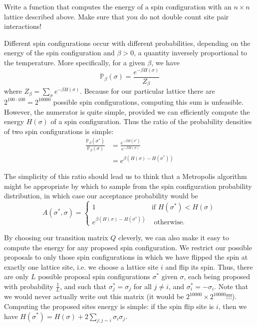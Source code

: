 \begin{problem}
Write a function that computes the energy of a spin configuration with an $n \times n$ lattice described above. Make sure that you do not double count site pair interactions!
\end{problem}

Different spin configurations occur with different probabilities, depending on the energy of the spin configuration and $\beta > 0$, a quantity inversely proportional to the temperature. More specifically, for a given $\beta$, we have
\begin{equation*}
\mathbb{P}_{\beta}(\sigma) = \frac{e^{-\beta H(\sigma)}}{Z_{\beta}}
\end{equation*}
where $Z_{\beta} = \sum_{\sigma} e^{-\beta H(\sigma)}$. Because for our particular lattice there are $2^{100 \cdot 100} = 2^{10000}$ possible spin configurations, computing this sum is unfeasible. However, the numerator is quite simple, provided we can efficiently compute the energy $H(\sigma)$ of a spin configuration. Thus the ratio of the probability densities of two spin configurations is simple:
\begin{align*}
\frac{\mathbb{P}_{\beta}(\sigma^{*})}{\mathbb{P}_{\beta}(\sigma)} & = \frac{e^{-\beta H(\sigma^{*})}}{e^{-\beta H(\sigma)}} \\
& = e^{\beta (H(\sigma) - H(\sigma^{*}))}
\end{align*}

The simplicity of this ratio should lead us to think that a Metropolis algorithm might be appropriate by which to sample from the spin configuration probability distribution, in which case our acceptance probability would be
\begin{equation*}
A(\sigma^{*}, \sigma) = \begin{cases} 1 & \mbox{if } H(\sigma^{*}) < H(\sigma) \\ e^{\beta (H(\sigma) - H(\sigma^{*}))} & \mbox{ otherwise.} \end{cases}
\end{equation*}

By choosing our transition matrix $Q$ cleverly, we can also make it easy to compute the energy for any proposed spin configuration. We restrict our possible proposals to only those spin configurations in which we have flipped the spin at exactly one lattice site, i.e. we choose a lattice site $i$ and flip its spin. Thus, there are only $L$ possible proposal spin configurations $\sigma^{*}$ given $\sigma$, each being proposed with probability $\frac{1}{L}$, and such that $\sigma_{j}^{*} = \sigma_{j}$ for all $j \neq i$, and $\sigma_{i}^{*} = - \sigma_{i}$. Note that we would never actually write out this matrix (it would be $2^{10000} \times 2^{10000}$!!!). Computing the proposed sites energy is simple: if the spin flip site is $i$, then we have $H(\sigma^{*}) = H(\sigma) + 2\sum_{j: j \sim i} \sigma_{i}\sigma_{j}$.

